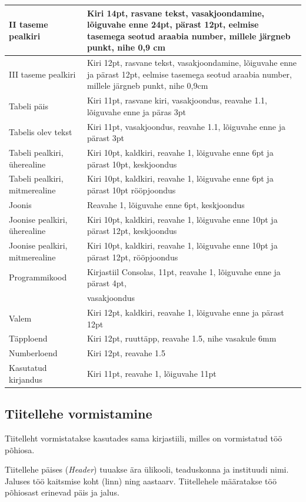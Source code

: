 \documentclass[12pt]{article} %
\begin{document}
\begin{longtable}{|p{4cm}|p{11cm}|}
II taseme pealkiri & Kiri 14pt, rasvane tekst, vasakjoondamine, lõiguvahe enne 24pt, pärast 12pt, eelmise tasemega seotud araabia number, millele järgneb punkt, nihe 0,9 cm \\ \hline
III taseme pealkiri & Kiri 12pt, rasvane tekst, vasakjoondamine, lõiguvahe enne ja pärast 12pt, eelmise tasemega seotud araabia number, millele järgneb punkt, nihe 0,9cm \\ \hline
Tabeli päis & Kiri 11pt, rasvane kiri, vasakjoondus, reavahe 1.1, lõiguvahe enne ja päras 3pt \\ \hline
Tabelis olev tekst & Kiri 11pt, vasakjoondus, reavahe 1.1, lõiguvahe enne ja pärast 3pt \\ \hline
Tabeli pealkiri, üherealine & Kiri 10pt, kaldkiri, reavahe 1, lõiguvahe enne 6pt ja pärast 10pt, keskjoondus \\ \hline
Tabeli pealkiri, mitmerealine  & Kiri 10pt, kaldkiri, reavahe 1, lõiguvahe enne 6pt ja pärast 10pt rööpjoondus \\ \hline
Joonis & Reavahe 1, lõiguvahe enne 6pt, keskjoondus \\ \hline
Joonise pealkiri, üherealine & Kiri 10pt, kaldkiri, reavahe 1, lõiguvahe enne 10pt ja pärast 12pt, keskjoondus \\ \hline
Joonise pealkiri, mitmerealine & Kiri 10pt, kaldkiri, reavahe 1, lõiguvahe enne 10pt ja pärast 12pt, rööpjoondus \\ \hline
Programmikood & Kirjastiil Consolas, 11pt, reavahe 1, lõiguvahe enne ja pärast 4pt, \\
& vasakjoondus\\ \hline
Valem & Kiri 12pt, kaldkiri, reavahe 1, lõiguvahe enne ja pärast 12pt \\ \hline
Täpploend & Kiri 12pt, ruuttäpp, reavahe 1.5, nihe vasakule 6mm \\ \hline
Numberloend & Kiri 12pt, reavahe 1.5 \\ \hline
Kasutatud kirjandus & Kiri 11pt, reavahe 1, lõiguvahe 11pt 
\end{longtable}
\pagebreak
 
\subsection{Tiitellehe vormistamine}
\label{Tiitellehe vormistamine} %
Tiitelleht vormistatakse kasutades sama kirjastiili, milles on vormistatud töö põhiosa.

Tiitellehe päises (\textit{Header}) tuuakse ära ülikooli, teaduskonna ja instituudi nimi. Jaluses töö kaitsmise koht (linn) ning aastaarv. Tiitellehele määratakse töö põhiosast erinevad päis ja jalus.
\end{document}
